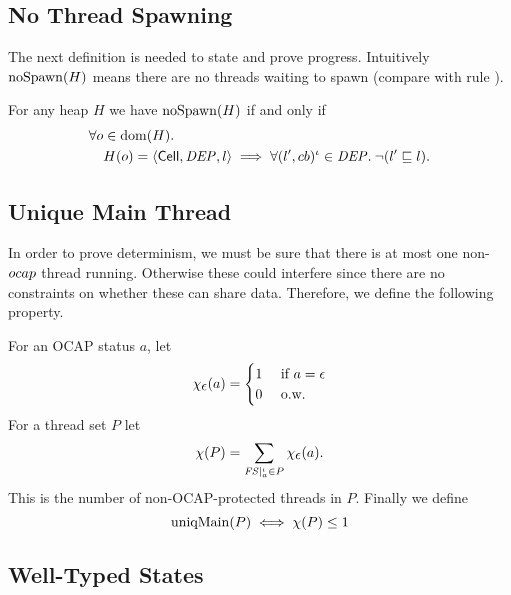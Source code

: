 \subsection{No Thread Spawning}%
\label{sub:no_thread_spawning}

The next definition is needed to state and prove progress. Intuitively
$\mbox{$\mathrm{noSpawn}$}(H)$ means there are no threads waiting to spawn (compare with rule
\ESpawn{}).
\begin{definition}[No Spawn]
  For any heap $H$ we have $\mbox{$\mathrm{noSpawn}$}(H)$ if and only if
  \begin{equation}
    \begin{aligned}
      \forall o &\in \mbox{$\mathrm{dom}$}(H). \\
        & H(o) = \mbox{$\langle \mbox{$\mathsf{Cell}$}{}, \mathit{DEP}, l \rangle$} \implies 
        \forall (l', cb)^\iota \in \mathit{DEP}. \: \lnot (l' \sqsubseteq l).
    \end{aligned}
  \end{equation}
\end{definition}

\subsection{Unique Main Thread}%
\label{sub:unique_main_thread}

In order to prove determinism, we must be sure that there is at most one
non-$\mbox{$ocap$}$ thread running. Otherwise these could interfere since there are no
constraints on whether these can share data. Therefore, we define the following
property.
\begin{definition}
  For an OCAP status $a$, let
  \begin{equation*}
    \chi_{\mbox{$\epsilon$}}(a) =
    \begin{cases}
      1 & \text{ if } a = \mbox{$\epsilon$} \\
      0 & \text{ o.w. }
    \end{cases}
  \end{equation*}
  For a thread set $P$ let
  \begin{equation*}
    \chi(P) = \sum_{\mathit{FS}|_a^\iota \in P} \chi_{\mbox{$\epsilon$}}(a).
  \end{equation*}
  This is the number of non-OCAP-protected threads in $P$. Finally we define
  \begin{equation*}
    \mbox{$\mathrm{uniqMain}$}(P) \iff \chi(P) \leq 1
  \end{equation*}
\end{definition}


\subsection{Well-Typed States}%
\label{sub:well_typed_states}

